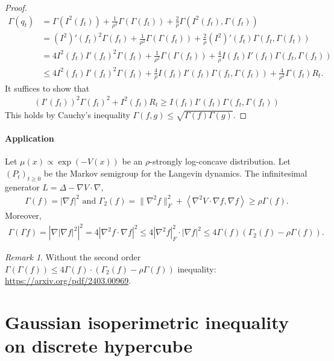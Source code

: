 \documentclass[11pt]{article}
\theoremstyle{plain}
\theoremstyle{definition}
\theoremstyle{remark}
\newtheorem{remark}[theorem]{Remark}
\newcommand{\hessian}{\nabla^2}
\newcommand{\tuple}[1]{\left(#1\right)}
\newcommand{\inner}[2]{\left\langle #1,#2\right\rangle}
\newcommand{\tp}{\tuple}
\newcommand{\abs}[1]{\left\vert#1\right\vert}
\begin{document}
\begin{proof}
\begin{align*}
        \Gamma(q_t) &= \Gamma(I^2(f_t)) + \frac{1}{\rho^2} \Gamma(\Gamma(f_t)) + \frac{2}{\rho} \Gamma(I^2(f_t), \Gamma(f_t))\\
        &= (I^2)'(f_t)^2 \Gamma(f_t) + \frac{1}{\rho^2} \Gamma(\Gamma(f_t)) + \frac{2}{\rho} (I^2)'(f_t) \Gamma(f_t, \Gamma(f_t))\\
        &= 4 I^2(f_t) I'(f_t)^2 \Gamma(f_t) + \frac{1}{\rho^2} \Gamma(\Gamma(f_t)) + \frac{4}{\rho} I(f_t) I'(f_t) \Gamma(f_t, \Gamma(f_t))\\
        &\le 4 I^2(f_t) I'(f_t)^2 \Gamma(f_t) + \frac{4}{\rho} I(f_t) I'(f_t) \Gamma(f_t, \Gamma(f_t)) + \frac{4}{\rho^2} \Gamma(f_t) R_t.
    \end{align*}
    It suffices to show that
    \begin{align*} 
        (I'(f_t))^2 \Gamma(f_t)^2+I^2(f_t) R_t \ge I(f_t) I'(f_t) \Gamma(f_t,\Gamma(f_t))
    \end{align*}
    This holds by Cauchy's inequality $\Gamma(f,g) \le \sqrt{\Gamma(f) \Gamma(g)}$.
\end{proof}

\paragraph{Application}
    Let $\mu(x) \propto \exp\tp{-V(x)}$ be an $\rho$-strongly log-concave distribution. Let $(P_t)_{t \ge 0}$ be the Markov semigroup for the Langevin dynamics.
    The infinitesimal generator $L = \Delta - \nabla V \cdot \nabla$,
    \begin{align*}
        \Gamma(f) = \abs{\nabla f}^2 \text{ and } \Gamma_2(f) = \|\hessian f\|_F^2 + \inner{\nabla^2 V \cdot \nabla f}{\nabla f} \ge \rho \Gamma(f).
    \end{align*}
    Moreover,
    \begin{align*}
        \Gamma(\Gamma f) = \abs{\nabla \abs{\nabla f}^2}^2 = 4 \abs{\nabla^2 f \cdot \nabla f}^2 \le 4 \abs{\nabla^2 f}_F^2 \cdot \abs{\nabla f}^2 \le 4 \Gamma(f) \tp{\Gamma_2(f) - \rho \Gamma(f)}.
    \end{align*}

\begin{remark}
Without the second order $\Gamma(\Gamma(f)) \le 4\Gamma(f) \cdot (\Gamma_2(f) - \rho \Gamma(f))$ inequality: \url{https://arxiv.org/pdf/2403.00969}.
\end{remark}
\section{Gaussian isoperimetric inequality on discrete hypercube}
\end{document}
